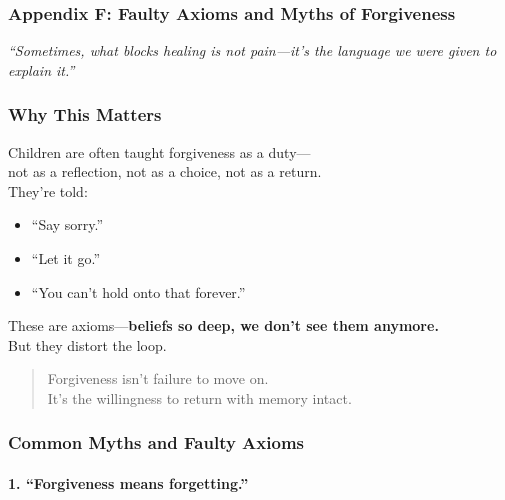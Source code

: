 \subsubsection{\texorpdfstring{\textbf{Appendix F: Faulty Axioms and Myths
of
Forgiveness}}{Appendix F: Faulty Axioms and Myths of Forgiveness}}\label{appendix-f-faulty-axioms-and-myths-of-forgiveness}

\emph{``Sometimes, what blocks healing is not pain---it's the language
we were given to explain it.''}

\subsubsection{\texorpdfstring{\textbf{Why This
Matters}}{Why This Matters}}\label{why-this-matters-2}

Children are often taught forgiveness as a duty---\\
not as a reflection, not as a choice, not as a return.\\
They're told:

\begin{itemize}
\item
  ``Say sorry.''
\item
  ``Let it go.''
\item
  ``You can't hold onto that forever.''
\end{itemize}

These are axioms---\textbf{beliefs so deep, we don't see them anymore.\\
} But they distort the loop.

\begin{quote}
Forgiveness isn't failure to move on.\\
It's the willingness to return with memory intact.
\end{quote}

\subsubsection{\texorpdfstring{\textbf{Common Myths and Faulty Axioms}}{Common Myths and Faulty Axioms}}\label{common-myths-and-faulty-axioms}

\paragraph{\texorpdfstring{\textbf{1. ``Forgiveness means
forgetting.''}}{1. ``Forgiveness means forgetting.''}}\label{forgiveness-means-forgetting.}

